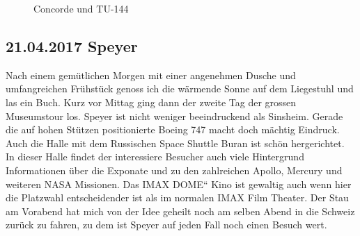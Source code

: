\begin{figure}[H]
   \centering
   \quad
   \quad
   \quad
   \caption[Concorde und TU-144]{Concorde und TU-144}
\end{figure}

\newpage

\subsection{21.04.2017 Speyer }
Nach einem gemütlichen Morgen mit einer angenehmen Dusche und umfangreichen Frühstück genoss ich die wärmende Sonne auf dem Liegestuhl und las ein Buch.
Kurz vor Mittag ging dann der zweite Tag der grossen Museumstour los.
Speyer ist nicht weniger beeindruckend als Sinsheim.
Gerade die auf hohen Stützen positionierte Boeing 747 macht doch mächtig Eindruck.
Auch die Halle mit dem Russischen Space Shuttle Buran ist schön hergerichtet.
In dieser Halle findet der interessiere Besucher auch viele Hintergrund Informationen über die Exponate und zu den zahlreichen Apollo, Mercury und weiteren NASA Missionen.
Das IMAX \quotedblbase DOME\textquotedblleft{} Kino ist gewaltig auch wenn hier die Platzwahl entscheidender ist als im normalen IMAX Film Theater.
Der Stau am Vorabend hat mich von der Idee geheilt noch am selben Abend in die Schweiz zurück zu fahren, zu dem ist Speyer auf jeden Fall noch einen Besuch wert.  

